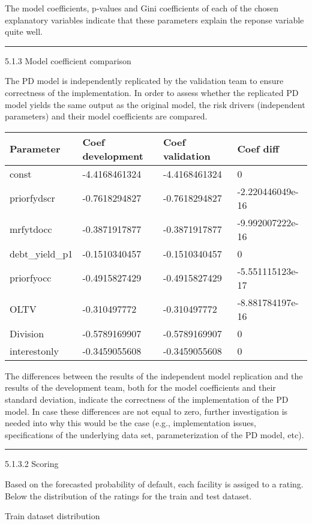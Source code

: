 The model coefficients, p-values and Gini coefficients of each of the
chosen explanatory variables indicate that these parameters explain the
reponse variable quite well.

\begin{center}\rule{0.5\linewidth}{\linethickness}\end{center}

5.1.3 Model coefficient comparison

The PD model is independently replicated by the validation team to
ensure correctness of the implementation. In order to assess whether the
replicated PD model yields the same output as the original model, the
risk drivers (independent parameters) and their model coefficients are
compared.

\begin{longtable}[]{@{}llll@{}}
\toprule
Parameter & Coef development & Coef validation & Coef
diff\tabularnewline
\midrule
\endhead
const & -4.4168461324 & -4.4168461324 & 0\tabularnewline
priorfydscr & -0.7618294827 & -0.7618294827 &
-2.220446049e-16\tabularnewline
mrfytdocc & -0.3871917877 & -0.3871917877 &
-9.992007222e-16\tabularnewline
debt\_yield\_p1 & -0.1510340457 & -0.1510340457 & 0\tabularnewline
priorfyocc & -0.4915827429 & -0.4915827429 &
-5.551115123e-17\tabularnewline
OLTV & -0.310497772 & -0.310497772 & -8.881784197e-16\tabularnewline
Division & -0.5789169907 & -0.5789169907 & 0\tabularnewline
interestonly & -0.3459055608 & -0.3459055608 & 0\tabularnewline
\bottomrule
\end{longtable}

The differences between the results of the independent model replication
and the results of the development team, both for the model coefficients
and their standard deviation, indicate the correctness of the
implementation of the PD model. In case these differences are not equal
to zero, further investigation is needed into why this would be the case
(e.g., implementation issues, specifications of the underlying data set,
parameterization of the PD model, etc).

\begin{center}\rule{0.5\linewidth}{\linethickness}\end{center}

5.1.3.2 Scoring

Based on the forecasted probability of default, each facility is assiged
to a rating. Below the distribution of the ratings for the train and
test dataset.

Train dataset distribution

